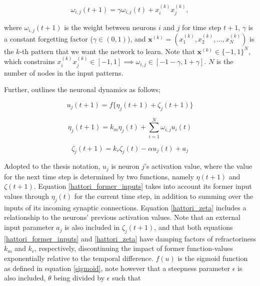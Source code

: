 \begin{equation}\label{hattori_hebbian_learning}
    \omega_{i,j}(t+1) = \gamma \omega_{i,j}(t) + x_i^{(k)} x_j^{(k)},
\end{equation}

where $\omega_{i,j}(t+1)$ is the weight between neurons $i$ and $j$ for time step $t+1$, $\gamma$ is a constant forgetting factor ($\gamma \in (0, 1)$), and $\textbf{x}^{(k)} = (x_1^{(k)}, x_2^{(k)}, ..., x_N^{(k)})$ is the $k$-th pattern that we want the network to learn. Note that $\textbf{x}^{(k)} \in \{-1,1\}^N$, which constrains $x_i^{(k)} x_j^{(k)} \in [-1,1] \implies \omega_{i,j} \in [-1-\gamma, 1+\gamma]$. $N$ is the number of nodes in the input patterns.

Further, \cite{Hattori2010} outlines the neuronal dynamics as follows;

\begin{equation}\label{hattori_next_output}
    u_j(t+1) = f\{\eta_j (t+1) + \zeta_j(t+1)\}
\end{equation}

\begin{equation}\label{hattori_former_inputs}
    \eta_j(t+1) = k_m \eta_j(t) + \sum_{i=1}^{N} \omega_{i,j} u_i(t)
\end{equation}

\begin{equation}\label{hattori_zeta}
    \zeta_j(t+1) = k_r \zeta_j(t) - \alpha u_j(t) + a_j
\end{equation}

Adopted to the thesis notation, $u_j$ is neuron $j$'s activation value, where the value for the next time step is determined by two functions, namely $\eta(t+1)$ and $\zeta(t+1)$. Equation \ref{hattori_former_inputs} takes into account its former input values through $\eta_j(t)$ for the current time step, in addition to summing over the inputs of its incoming synaptic connections. Equation \ref{hattori_zeta} includes a relationship to the neurons' previous activation values. Note that an external input parameter $a_j$ is also included in $\zeta_j(t+1)$, and that both equations \ref{hattori_former_inputs} and \ref{hattori_zeta} have damping factors of refractoriness $k_m$ and $k_r$, respectively, discontinuing the impact of former function-values exponentially relative to the temporal difference. $f(u)$ is the sigmoid function as defined in equation \ref{sigmoid}, note however that a steepness parameter $\epsilon$ is also included, $\theta$ being divided by $\epsilon$ such that

